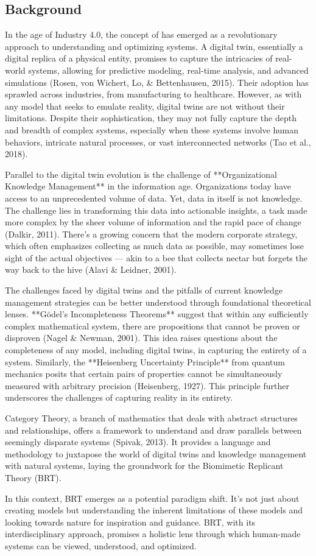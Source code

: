 \subsection{Background}
In the age of Industry 4.0, the concept of has emerged as a revolutionary approach to understanding and optimizing systems. A digital twin, essentially a digital replica of a physical entity, promises to capture the intricacies of real-world systems, allowing for predictive modeling, real-time analysis, and advanced simulations (Rosen, von Wichert, Lo, \& Bettenhausen, 2015). Their adoption has sprawled across industries, from manufacturing to healthcare. However, as with any model that seeks to emulate reality, digital twins are not without their limitations. Despite their sophistication, they may not fully capture the depth and breadth of complex systems, especially when these systems involve human behaviors, intricate natural processes, or vast interconnected networks (Tao et al., 2018).

Parallel to the digital twin evolution is the challenge of **Organizational Knowledge Management** in the information age. Organizations today have access to an unprecedented volume of data. Yet, data in itself is not knowledge. The challenge lies in transforming this data into actionable insights, a task made more complex by the sheer volume of information and the rapid pace of change (Dalkir, 2011). There's a growing concern that the modern corporate strategy, which often emphasizes collecting as much data as possible, may sometimes lose sight of the actual objectives — akin to a bee that collects nectar but forgets the way back to the hive (Alavi \& Leidner, 2001).

The challenges faced by digital twins and the pitfalls of current knowledge management strategies can be better understood through foundational theoretical lenses. **Gödel's Incompleteness Theorems** suggest that within any sufficiently complex mathematical system, there are propositions that cannot be proven or disproven (Nagel \& Newman, 2001). This idea raises questions about the completeness of any model, including digital twins, in capturing the entirety of a system. Similarly, the **Heisenberg Uncertainty Principle** from quantum mechanics posits that certain pairs of properties cannot be simultaneously measured with arbitrary precision (Heisenberg, 1927). This principle further underscores the challenges of capturing reality in its entirety.

Category Theory, a branch of mathematics that deals with abstract structures and relationships, offers a framework to understand and draw parallels between seemingly disparate systems (Spivak, 2013). It provides a language and methodology to juxtapose the world of digital twins and knowledge management with natural systems, laying the groundwork for the Biomimetic Replicant Theory (BRT).

In this context, BRT emerges as a potential paradigm shift. It's not just about creating models but understanding the inherent limitations of these models and looking towards nature for inspiration and guidance. BRT, with its interdisciplinary approach, promises a holistic lens through which human-made systems can be viewed, understood, and optimized.